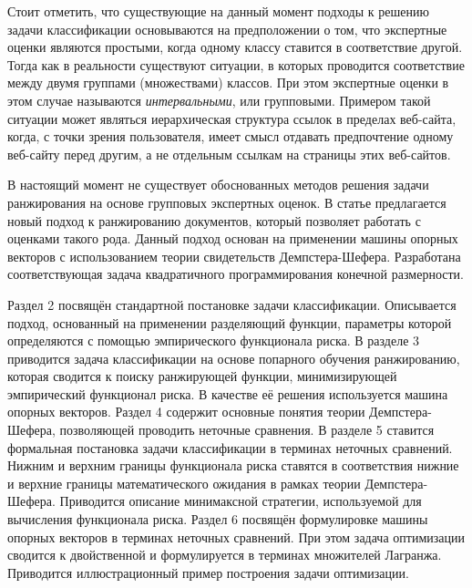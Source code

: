 \documentclass[12pt,a4paper,oneside]{article}
\begin{document}
\par
Стоит отметить, что существующие на данный момент подходы к решению задачи классификации основываются на предположении о том, что экспертные оценки являются простыми, когда одному классу ставится в соответствие другой. 
Тогда как в реальности существуют ситуации, в которых проводится соответствие между двумя группами (множествами) классов. 
При этом экспертные оценки в этом случае называются \emph{интервальными}, или групповыми. 
Примером такой ситуации может являться иерархическая структура ссылок в пределах веб-сайта, когда, с точки зрения пользователя, имеет смысл отдавать предпочтение одному веб-сайту перед другим, а не отдельным ссылкам на страницы этих веб-сайтов. 

\par
В настоящий момент не существует обоснованных методов решения задачи ранжирования на основе групповых экспертных оценок. 
В статье предлагается новый подход к ранжированию документов, который позволяет работать с оценками такого рода. 
Данный подход основан на применении машины опорных векторов с использованием теории свидетельств Демпстера-Шефера. 
Разработана соответствующая задача квадратичного программирования конечной размерности. 

\par
Раздел 2 посвящён стандартной постановке задачи классификации. 
Описывается подход, основанный на применении разделяющий функции, параметры которой определяются с помощью эмпирического функционала риска. 
В разделе 3 приводится задача классификации на основе попарного обучения ранжированию, которая сводится к поиску ранжирующей функции, минимизирующей эмпирический функционал риска. 
В качестве её решения используется машина опорных векторов. 
Раздел 4 содержит основные понятия теории Демпстера-Шефера, позволяющей проводить неточные сравнения. 
В разделе 5 ставится формальная постановка задачи классификации в терминах неточных сравнений. 
Нижним и верхним границы функционала риска ставятся в соответствия нижние и верхние границы математического ожидания в рамках теории Демпстера-Шефера. 
Приводится описание минимаксной стратегии, используемой для вычисления функционала риска. 
Раздел 6 посвящён формулировке машины опорных векторов в терминах неточных сравнений.
При этом задача оптимизации сводится к двойственной и формулируется в терминах множителей Лагранжа. 
Приводится иллюстрационный пример построения задачи оптимизации. 


\end{document}
